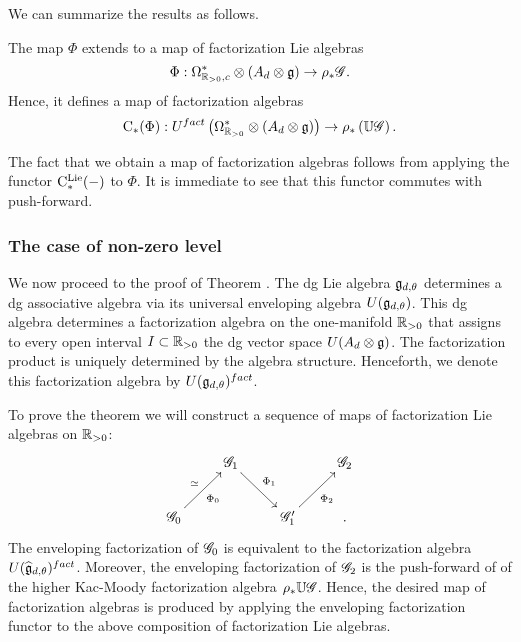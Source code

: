 We can summarize the results as follows.

\begin{prop}\label{prop: fact lie}The map $\Phi$ extends to a map of factorization Lie algebras
\[
\Phi : \Omega^*_{\mathbb R_{>0},c} \otimes (A_d \otimes \mathfrak g) \to \rho_*\mathscr G .
\] 
Hence, it defines a map of factorization algebras
\[
{\rm C}_*(\Phi) : U^{fact}\left(\Omega^{*}_{\mathbb R_{>0}} \otimes (A_d \otimes \mathfrak g)\right) \to \rho_*\left(\mathbb U \mathscr G \right) .
\]
\end{prop}

The fact that we obtain a map of factorization algebras follows from applying the functor ${\rm C}^{\rm Lie}_*(-)$ to $\Phi$. It is immediate to see that this functor commutes with push-forward. 

\subsubsection{The case of non-zero level}

We now proceed to the proof of Theorem \label{thm sphere alg}. 
The dg Lie algebra $\mathfrak g_{d,\theta}$ determines a dg associative algebra via its universal enveloping algebra $U(\mathfrak g_{d,\theta})$.
This dg algebra determines a factorization algebra on the one-manifold $\mathbb R_{>0}$ that assigns to every open interval $I \subset \mathbb R_{>0}$ the dg vector space $U(A_d \otimes \mathfrak g)$. 
The factorization product is uniquely determined by the algebra structure. 
Henceforth, we denote this factorization algebra by $U(\mathfrak g_{d,\theta})^{fact}$.

To prove the theorem we will construct a sequence of maps of factorization Lie algebras on $\mathbb R_{>0}$:
\[
\xymatrix{
& \sG_1 \ar[dr]^-{\Phi_1} & & \sG_2 \\
\sG_0 \ar[ur]^-{\simeq}_{\Phi_0} & & \sG_1' \ar[ur]_{\Phi_2} & .
}
\]
The enveloping factorization of $\mathscr G_0$ is equivalent to the factorization algebra $U (\widehat{\mathfrak g}_{d,\theta})^{fact}$. 
Moreover, the enveloping factorization of $\mathscr G_2$ is the push-forward of of the higher Kac-Moody factorization algebra $\rho_* \mathbb U \mathscr G$. 
Hence, the desired map of factorization algebras is produced by applying the enveloping factorization functor to the above composition of factorization Lie algebras. 

